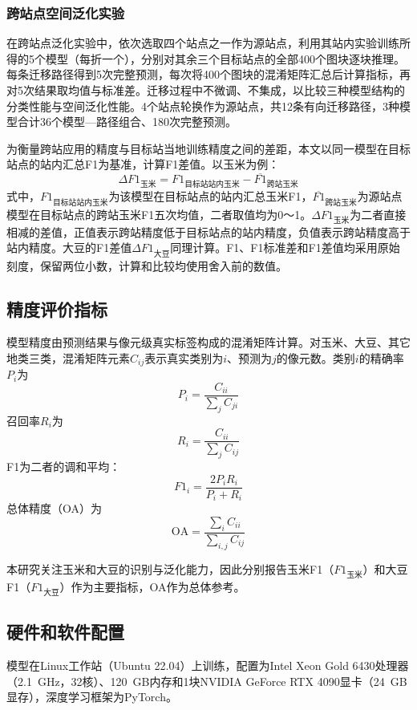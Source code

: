 \subsubsection{跨站点空间泛化实验}

在跨站点泛化实验中，依次选取四个站点之一作为源站点，利用其站内实验训练所得的5个模型（每折一个），分别对其余三个目标站点的全部400个图块逐块推理。每条迁移路径得到5次完整预测，每次将400个图块的混淆矩阵汇总后计算指标，再对5次结果取均值与标准差。迁移过程中不微调、不集成，以比较三种模型结构的分类性能与空间泛化性能。4个站点轮换作为源站点，共12条有向迁移路径，3种模型合计36个模型—路径组合、180次完整预测。

为衡量跨站应用的精度与目标站当地训练精度之间的差距，本文以同一模型在目标站点的站内汇总F1为基准，计算F1差值。以玉米为例：
\begin{equation}
\Delta F1_{\text{玉米}} = F1_{\text{目标站站内玉米}} - \overline{F1}_{\text{跨站玉米}}
\end{equation}
式中，$F1_{\text{目标站站内玉米}}$为该模型在目标站点的站内汇总玉米F1，$\overline{F1}_{\text{跨站玉米}}$为源站点模型在目标站点的跨站玉米F1五次均值，二者取值均为0～1。$\Delta F1_{\text{玉米}}$为二者直接相减的差值，正值表示跨站精度低于目标站点的站内精度，负值表示跨站精度高于站内精度。大豆的F1差值$\Delta F1_{\text{大豆}}$同理计算。F1、F1标准差和F1差值均采用原始刻度，保留两位小数，计算和比较均使用舍入前的数值。

\subsection{精度评价指标}

模型精度由预测结果与像元级真实标签构成的混淆矩阵计算。对玉米、大豆、其它地类三类，混淆矩阵元素$C_{ij}$表示真实类别为$i$、预测为$j$的像元数。类别$i$的精确率$P_i$为
\begin{equation}
P_i = \frac{C_{ii}}{\sum_{j} C_{ji}}
\end{equation}
召回率$R_i$为
\begin{equation}
R_i = \frac{C_{ii}}{\sum_{j} C_{ij}}
\end{equation}
F1为二者的调和平均：
\begin{equation}
F1_i = \frac{2 P_i R_i}{P_i + R_i}
\end{equation}
总体精度（OA）为
\begin{equation}
\text{OA} = \frac{\sum_{i} C_{ii}}{\sum_{i,j} C_{ij}}
\end{equation}

本研究关注玉米和大豆的识别与泛化能力，因此分别报告玉米F1（$F1_{\text{玉米}}$）和大豆F1（$F1_{\text{大豆}}$）作为主要指标，OA作为总体参考。

\subsection{硬件和软件配置}

模型在Linux工作站（Ubuntu 22.04）上训练，配置为Intel Xeon Gold 6430处理器（2.1~GHz，32核）、120~GB内存和1块NVIDIA GeForce RTX 4090显卡（24~GB显存），深度学习框架为PyTorch。
